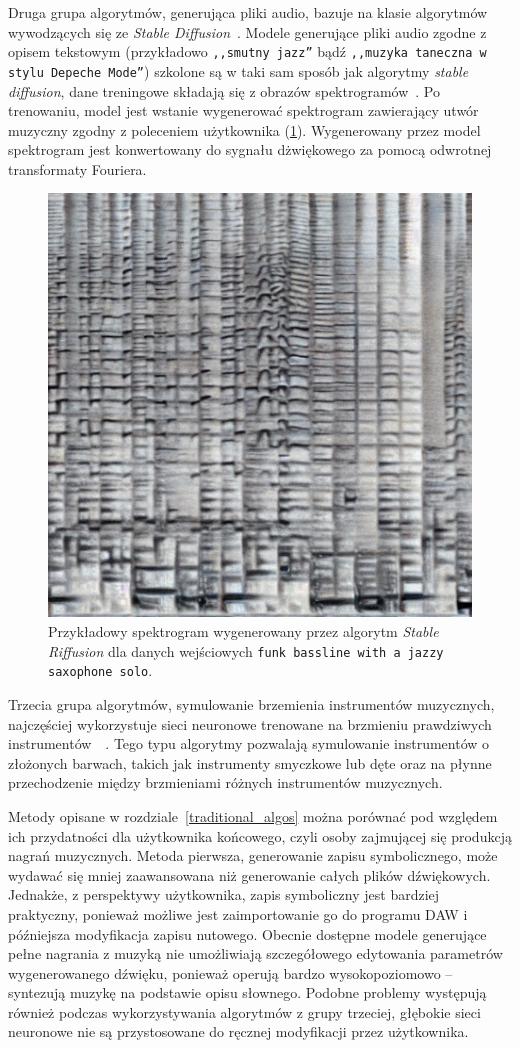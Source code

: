 Druga grupa algorytmów, generująca pliki audio, bazuje na klasie algorytmów
wywodzących się ze \textit{Stable Diffusion}~\cite{stablediffusion}.
Modele generujące pliki audio zgodne z opisem tekstowym 
(przykładowo \texttt{,,smutny jazz''} bądź \texttt{,,muzyka taneczna w stylu Depeche Mode''})
szkolone są w taki sam sposób jak algorytmy \textit{stable diffusion},
dane treningowe składają się z obrazów spektrogramów~\cite{riffusion}. 
Po trenowaniu, model jest wstanie wygenerować spektrogram zawierający
utwór muzyczny zgodny z poleceniem użytkownika (\ref{fig:riffusion_spectro}).
Wygenerowany przez model spektrogram jest konwertowany 
do sygnału dżwiękowego za pomocą odwrotnej transformaty Fouriera.

\begin{figure}[H]
    \centering
    \includegraphics[width=0.4\linewidth]{rys01/riffusion_spectro.jpg}
    \caption{
      Przykładowy spektrogram wygenerowany przez algorytm \textit{Stable Riffusion}
      dla danych wejściowych \texttt{funk bassline with a jazzy saxophone solo}.
    }\label{fig:riffusion_spectro}
\end{figure}

Trzecia grupa algorytmów, symulowanie brzemienia instrumentów muzycznych, najczęściej wykorzystuje sieci
neuronowe trenowane na brzmieniu prawdziwych instrumentów~\cite{engel2017neural}~\cite{engel2020ddsp}. 
Tego typu algorytmy pozwalają symulowanie instrumentów o złożonych barwach, takich jak instrumenty
smyczkowe lub dęte oraz na płynne przechodzenie między brzmieniami różnych instrumentów muzycznych.


Metody opisane w rozdziale~\ref{traditional_algos} można porównać pod względem ich przydatności
dla użytkownika końcowego, czyli osoby zajmującej się produkcją nagrań muzycznych. Metoda pierwsza, 
generowanie zapisu symbolicznego, może wydawać się mniej zaawansowana niż generowanie całych plików dźwiękowych.
Jednakże, z perspektywy użytkownika, zapis symboliczny jest bardziej praktyczny,
ponieważ możliwe jest zaimportowanie go do programu DAW i późniejsza modyfikacja zapisu nutowego.
Obecnie dostępne modele generujące pełne nagrania z muzyką nie umożliwiają
szczegółowego edytowania parametrów wygenerowanego dźwięku, ponieważ operują bardzo wysokopoziomowo 
-- syntezują muzykę na podstawie opisu słownego. Podobne problemy występują również podczas wykorzystywania
algorytmów z grupy trzeciej, głębokie sieci neuronowe nie są przystosowane do ręcznej modyfikacji przez użytkownika.

